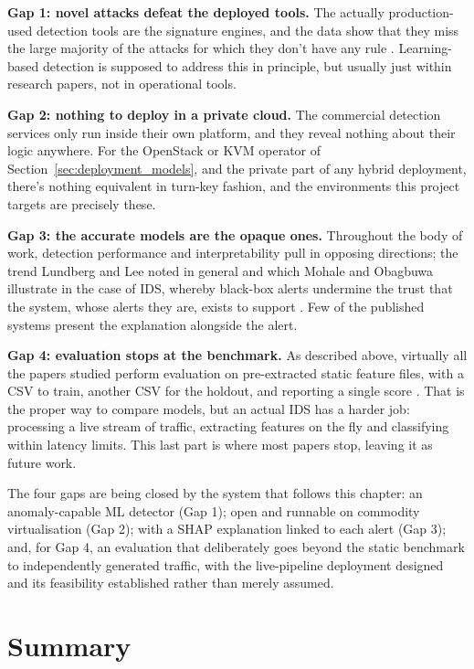 \textbf{Gap 1: novel attacks defeat the deployed tools.} The actually production-used detection tools are the signature engines, and the data show that they miss the large majority of the attacks for which they don’t have any rule \cite{holm2014signature}. Learning-based detection is supposed to address this in principle, but usually just within research papers, not in operational tools.

\textbf{Gap 2: nothing to deploy in a private cloud.} The commercial detection services only run inside their own platform, and they reveal nothing about their logic anywhere. For the OpenStack or KVM operator of Section~\ref{sec:deployment_models}, and the private part of any hybrid deployment, there’s nothing equivalent in turn-key fashion, and the environments this project targets are precisely these.

\textbf{Gap 3: the accurate models are the opaque ones.} Throughout the body of work, detection performance and interpretability pull in opposing directions; the trend Lundberg and Lee noted in general \cite{lundberg2017shap} and which Mohale and Obagbuwa illustrate in the case of IDS, whereby black-box alerts undermine the trust that the system, whose alerts they are, exists to support \cite{mohale2025xaiids}. Few of the published systems present the explanation alongside the alert.

\textbf{Gap 4: evaluation stops at the benchmark.} As described above, virtually all the papers studied perform evaluation on pre-extracted static feature files, with a CSV to train, another CSV for the holdout, and reporting a single score \cite{ahmad2021network, ali2025dlvsml}. That is the proper way to compare models, but an actual IDS has a harder job: processing a live stream of traffic, extracting features on the fly and classifying within latency limits. This last part is where most papers stop, leaving it as future work.

The four gaps are being closed by the system that follows this chapter: an anomaly-capable ML detector (Gap 1); open and runnable on commodity virtualisation (Gap 2); with a SHAP explanation linked to each alert (Gap 3); and, for Gap 4, an evaluation that deliberately goes beyond the static benchmark to independently generated traffic, with the live-pipeline deployment designed and its feasibility established rather than merely assumed.

\section{Summary}
\label{sec:ids_summary}

